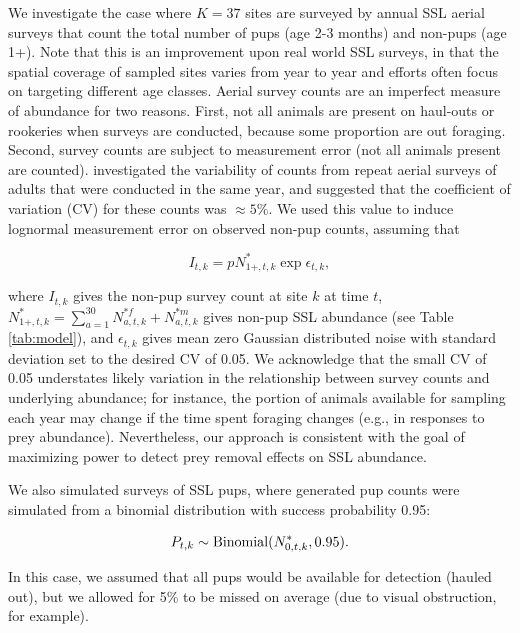 \documentclass[11pt]{article}
\begin{document}
We investigate the case where $K=37$ sites are surveyed by annual SSL aerial surveys that count the total
number of pups (age 2-3 months) and non-pups (age 1+).  Note that this is an improvement upon real world SSL surveys, in that the spatial coverage of sampled sites varies from year to year and efforts often focus on targeting different age classes. Aerial survey counts are an imperfect measure of abundance for two reasons.  First, not all animals are present on haul-outs or rookeries when surveys are conducted, because some proportion are out foraging.  Second, survey counts are subject to measurement error (not all animals present are counted).  \citet{HolmesEtAl2007} investigated the variability of counts from repeat aerial surveys of adults that were conducted in the same year, and suggested that the coefficient of variation (CV) for these counts was $\approx 5\%$.  We used this value to induce lognormal measurement error on observed non-pup counts, assuming that
\begin{linenomath}
  \begin{equation}
     I_{t,k} = p N_{1+,t,k}^{*}\exp{\epsilon_{t,k}},
  \end{equation}
\end{linenomath}
where $I_{t,k}$ gives the non-pup survey count at site $k$ at time $t$, $N_{1+,t,k}^*=\sum_{a=1}^{30} N_{a,t,k}^{*f}+N_{a,t,k}^{*m}$ gives non-pup SSL abundance (see Table \ref{tab:model}), and $\epsilon_{t,k}$ gives mean zero Gaussian distributed noise with standard deviation set to the desired CV of 0.05. We acknowledge that the small CV of 0.05 understates likely variation in the relationship between survey counts and underlying abundance; for instance, the portion of animals available for sampling each year may change if the time spent foraging changes (e.g., in responses to prey abundance).  Nevertheless, our approach is consistent with the goal of maximizing power to detect prey removal effects on SSL abundance.

We also simulated surveys of SSL pups, where generated pup counts were simulated from a binomial distribution with success probability 0.95:
\begin{linenomath}
  \begin{equation}
     P_{t,k} \sim {\rm Binomial}(N_{0,t,k}^*,0.95).
  \end{equation}
\end{linenomath}
In this case, we assumed that all pups would be available for detection (hauled out), but we allowed for 5\% to be missed on average (due to visual obstruction, for example).
\end{document}
